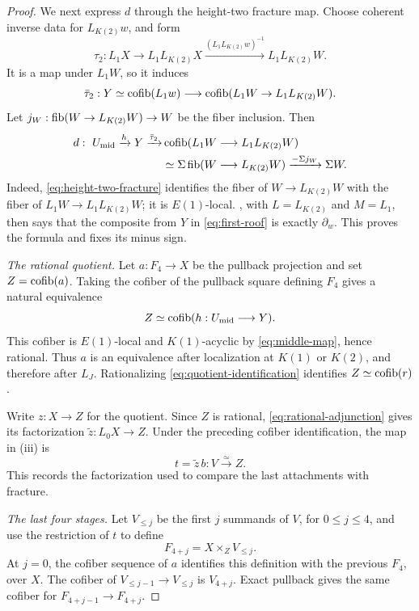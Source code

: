 \begin{proof}
We next express \(d\) through the height-two fracture map.  Choose
coherent inverse data for \(L_{K(2)}w\), and form
\[
 \tau_2:L_1X\longrightarrow L_1L_{K(2)}X
       \xrightarrow{(L_1L_{K(2)}w)^{-1}}L_1L_{K(2)}W.
\]
It is a map under \(L_1W\), so it induces
\[
 \bar\tau_2:Y\simeq\operatorname{cofib}(L_1w)
       \longrightarrow\operatorname{cofib}(L_1W\to L_1L_{K(2)}W).
\]
Let \(j_W:\operatorname{fib}(W\to L_{K(2)}W)\to W\) be the fiber inclusion.
Then
\begin{equation}\label{eq:first-roof}
\begin{split}
 d:\ U_{\mathrm{mid}}\xrightarrow hY\xrightarrow{\bar\tau_2}
 &\operatorname{cofib}(L_1W\longrightarrow L_1L_{K(2)}W)\\
 &\simeq\Sigma\operatorname{fib}(W\longrightarrow L_{K(2)}W)
   \xrightarrow{-\Sigma j_W}\Sigma W.
\end{split}
\end{equation}
Indeed, \eqref{eq:height-two-fracture} identifies the fiber of
\(W\to L_{K(2)}W\) with the fiber of
\(L_1W\to L_1L_{K(2)}W\); it is \(E(1)\)-local.
, with \(L=L_{K(2)}\) and \(M=L_1\),
then says that the composite from \(Y\) in
\eqref{eq:first-roof} is exactly \(\partial_w\).  This proves
the formula and fixes its minus sign.

\emph{The rational quotient.}
Let \(a:F_4\to X\) be the pullback projection and set
\(Z=\operatorname{cofib}(a)\).  Taking the cofiber of the pullback square defining
\(F_4\) gives a natural equivalence
\begin{equation}\label{eq:quotient-identification}
 Z\simeq\operatorname{cofib}(h:U_{\mathrm{mid}}\longrightarrow Y).
\end{equation}
This cofiber is \(E(1)\)-local and \(K(1)\)-acyclic by
\eqref{eq:middle-map}, hence rational.  Thus \(a\) is an
equivalence after localization at \(K(1)\) or \(K(2)\), and
therefore after \(L_J\).  Rationalizing
\eqref{eq:quotient-identification} identifies
\(Z\simeq\operatorname{cofib}(r)\).

Write \(z:X\to Z\) for the quotient.  Since \(Z\) is rational,
\eqref{eq:rational-adjunction} gives its factorization
\(\widetilde z:L_0X\to Z\).  Under the preceding cofiber
identification, the map in \textup{(iii)} is
\begin{equation}\label{eq:terminal-quotient}
 t=\widetilde z\,b:V\xrightarrow{\simeq}Z.
\end{equation}
This records the factorization used to compare the last attachments
with fracture.

\emph{The last four stages.}
Let \(V_{\leq j}\) be the first \(j\) summands of \(V\), for
\(0\leq j\leq4\), and use the restriction of \(t\) to define
\begin{equation}\label{eq:last-stages}
 F_{4+j}=X\mathbin{\times}_ZV_{\leq j}.
\end{equation}
At \(j=0\), the cofiber sequence of \(a\) identifies this
definition with the previous \(F_4\), over \(X\).
The cofiber of \(V_{\leq j-1}\to V_{\leq j}\) is \(V_{4+j}\).
Exact pullback gives the same cofiber for
\(F_{4+j-1}\to F_{4+j}\).


\end{proof}
